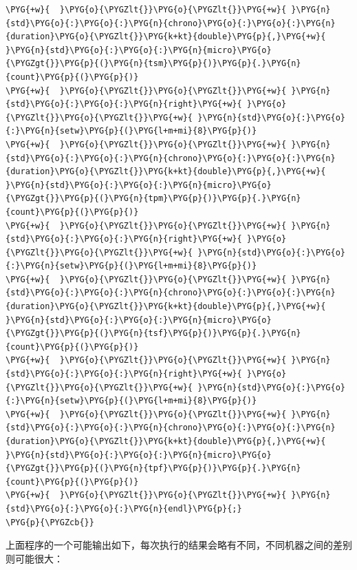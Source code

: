 \begin{codeblockbg}
\begin{Verbatim}[commandchars=\\\{\},breaklines=true,breakanywhere=true,fontsize=\codefont,xleftmargin=17bp]
\PYG{+w}{  }\PYG{o}{\PYGZlt{}}\PYG{o}{\PYGZlt{}}\PYG{+w}{ }\PYG{n}{std}\PYG{o}{:}\PYG{o}{:}\PYG{n}{chrono}\PYG{o}{:}\PYG{o}{:}\PYG{n}{duration}\PYG{o}{\PYGZlt{}}\PYG{k+kt}{double}\PYG{p}{,}\PYG{+w}{ }\PYG{n}{std}\PYG{o}{:}\PYG{o}{:}\PYG{n}{micro}\PYG{o}{\PYGZgt{}}\PYG{p}{(}\PYG{n}{tsm}\PYG{p}{)}\PYG{p}{.}\PYG{n}{count}\PYG{p}{(}\PYG{p}{)}
\PYG{+w}{  }\PYG{o}{\PYGZlt{}}\PYG{o}{\PYGZlt{}}\PYG{+w}{ }\PYG{n}{std}\PYG{o}{:}\PYG{o}{:}\PYG{n}{right}\PYG{+w}{ }\PYG{o}{\PYGZlt{}}\PYG{o}{\PYGZlt{}}\PYG{+w}{ }\PYG{n}{std}\PYG{o}{:}\PYG{o}{:}\PYG{n}{setw}\PYG{p}{(}\PYG{l+m+mi}{8}\PYG{p}{)}
\PYG{+w}{  }\PYG{o}{\PYGZlt{}}\PYG{o}{\PYGZlt{}}\PYG{+w}{ }\PYG{n}{std}\PYG{o}{:}\PYG{o}{:}\PYG{n}{chrono}\PYG{o}{:}\PYG{o}{:}\PYG{n}{duration}\PYG{o}{\PYGZlt{}}\PYG{k+kt}{double}\PYG{p}{,}\PYG{+w}{ }\PYG{n}{std}\PYG{o}{:}\PYG{o}{:}\PYG{n}{micro}\PYG{o}{\PYGZgt{}}\PYG{p}{(}\PYG{n}{tpm}\PYG{p}{)}\PYG{p}{.}\PYG{n}{count}\PYG{p}{(}\PYG{p}{)}
\PYG{+w}{  }\PYG{o}{\PYGZlt{}}\PYG{o}{\PYGZlt{}}\PYG{+w}{ }\PYG{n}{std}\PYG{o}{:}\PYG{o}{:}\PYG{n}{right}\PYG{+w}{ }\PYG{o}{\PYGZlt{}}\PYG{o}{\PYGZlt{}}\PYG{+w}{ }\PYG{n}{std}\PYG{o}{:}\PYG{o}{:}\PYG{n}{setw}\PYG{p}{(}\PYG{l+m+mi}{8}\PYG{p}{)}
\PYG{+w}{  }\PYG{o}{\PYGZlt{}}\PYG{o}{\PYGZlt{}}\PYG{+w}{ }\PYG{n}{std}\PYG{o}{:}\PYG{o}{:}\PYG{n}{chrono}\PYG{o}{:}\PYG{o}{:}\PYG{n}{duration}\PYG{o}{\PYGZlt{}}\PYG{k+kt}{double}\PYG{p}{,}\PYG{+w}{ }\PYG{n}{std}\PYG{o}{:}\PYG{o}{:}\PYG{n}{micro}\PYG{o}{\PYGZgt{}}\PYG{p}{(}\PYG{n}{tsf}\PYG{p}{)}\PYG{p}{.}\PYG{n}{count}\PYG{p}{(}\PYG{p}{)}
\PYG{+w}{  }\PYG{o}{\PYGZlt{}}\PYG{o}{\PYGZlt{}}\PYG{+w}{ }\PYG{n}{std}\PYG{o}{:}\PYG{o}{:}\PYG{n}{right}\PYG{+w}{ }\PYG{o}{\PYGZlt{}}\PYG{o}{\PYGZlt{}}\PYG{+w}{ }\PYG{n}{std}\PYG{o}{:}\PYG{o}{:}\PYG{n}{setw}\PYG{p}{(}\PYG{l+m+mi}{8}\PYG{p}{)}
\PYG{+w}{  }\PYG{o}{\PYGZlt{}}\PYG{o}{\PYGZlt{}}\PYG{+w}{ }\PYG{n}{std}\PYG{o}{:}\PYG{o}{:}\PYG{n}{chrono}\PYG{o}{:}\PYG{o}{:}\PYG{n}{duration}\PYG{o}{\PYGZlt{}}\PYG{k+kt}{double}\PYG{p}{,}\PYG{+w}{ }\PYG{n}{std}\PYG{o}{:}\PYG{o}{:}\PYG{n}{micro}\PYG{o}{\PYGZgt{}}\PYG{p}{(}\PYG{n}{tpf}\PYG{p}{)}\PYG{p}{.}\PYG{n}{count}\PYG{p}{(}\PYG{p}{)}
\PYG{+w}{  }\PYG{o}{\PYGZlt{}}\PYG{o}{\PYGZlt{}}\PYG{+w}{ }\PYG{n}{std}\PYG{o}{:}\PYG{o}{:}\PYG{n}{endl}\PYG{p}{;}
\PYG{p}{\PYGZcb{}}
\end{Verbatim}
\end{codeblockbg}



上面程序的一个可能输出如下，每次执行的结果会略有不同，不同机器之间的差别则可能很大：




